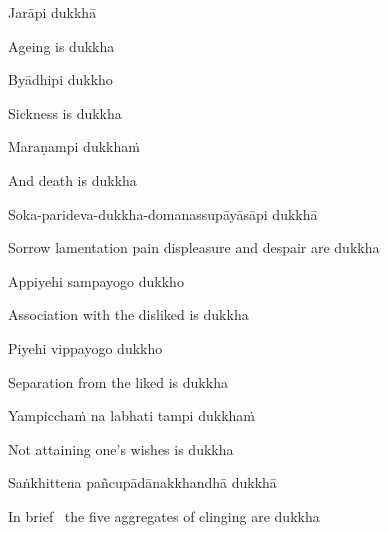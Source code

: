 Jarāpi dukkhā

\begin{english}
  Ageing is dukkha
\end{english}

Byādhipi dukkho

\begin{english}
  Sickness is dukkha
\end{english}

Maraṇampi dukkhaṁ

\begin{english}
  And death is dukkha
\end{english}

Soka-parideva-dukkha-domanassupāyāsāpi dukkhā

\begin{english}
  Sorrow lamentation pain displeasure
  and despair are dukkha
\end{english}

Appiyehi sampayogo dukkho

\begin{english}
  Association with the disliked is dukkha
\end{english}

Piyehi vippayogo dukkho

\begin{english}
  Separation from the liked is dukkha
\end{english}

Yampicchaṁ na labhati tampi dukkhaṁ

\begin{english}
  Not attaining one’s wishes is dukkha
\end{english}

Saṅkhittena pañcupādānakkhandhā dukkhā

\begin{english}
  In brief \breathmark\ the five aggregates of clinging are dukkha
\end{english}

